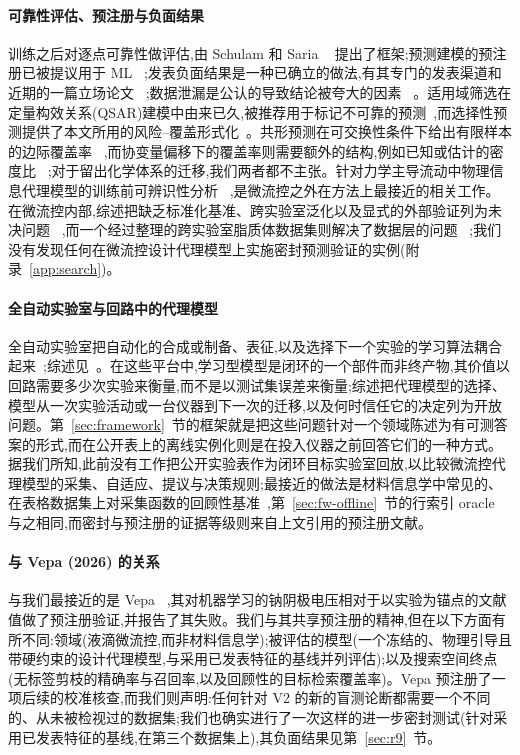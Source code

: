 \documentclass[11pt,a4paper]{ctexart}
\begin{document}
\paragraph{可靠性评估、预注册与负面结果} 训练之后对逐点可靠性做评估,由 Schulam 和 Saria ~\cite{schulam2019} 提出了框架;预测建模的预注册已被提议用于 ML ~\cite{hofman2023};发表负面结果是一种已确立的做法,有其专门的发表渠道和近期的一篇立场论文 ~\cite{karl2024};数据泄漏是公认的导致结论被夸大的因素 ~\cite{kapoor2023}。适用域筛选在定量构效关系(QSAR)建模中由来已久,被推荐用于标记不可靠的预测~\cite{tropsha2003,netzeva2005,sahigara2012},而选择性预测提供了本文所用的风险–覆盖形式化~\cite{elyaniv2010}。共形预测在可交换性条件下给出有限样本的边际覆盖率 ~\cite{vovk2005,romano2019},而协变量偏移下的覆盖率则需要额外的结构,例如已知或估计的密度比 ~\cite{tibshirani2019,barber2023};对于留出化学体系的迁移,我们两者都不主张。针对力学主导流动中物理信息代理模型的训练前可辨识性分析 ~\cite{cieslak2026},是微流控之外在方法上最接近的相关工作。在微流控内部,综述把缺乏标准化基准、跨实验室泛化以及显式的外部验证列为未决问题 ~\cite{labchip2025review,das2025,delgiudice2026},而一个经过整理的跨实验室脂质体数据集则解决了数据层的问题 ~\cite{smartmicrofluidics2026};我们没有发现任何在微流控设计代理模型上实施密封预测验证的实例(附录~\ref{app:search})。

\paragraph{全自动实验室与回路中的代理模型} 全自动实验室把自动化的合成或制备、表征,以及选择下一个实验的学习算法耦合起来~\cite{macleod2020};综述见~\cite{abolhasani2023,tom2024sdl}。在这些平台中,学习型模型是闭环的一个部件而非终产物,其价值以回路需要多少次实验来衡量,而不是以测试集误差来衡量;综述把代理模型的选择、模型从一次实验活动或一台仪器到下一次的迁移,以及何时信任它的决定列为开放问题。第~\ref{sec:framework}~节的框架就是把这些问题针对一个领域陈述为有可测答案的形式,而在公开表上的离线实例化则是在投入仪器之前回答它们的一种方式。据我们所知,此前没有工作把公开实验表作为闭环目标实验室回放,以比较微流控代理模型的采集、自适应、提议与决策规则;最接近的做法是材料信息学中常见的、在表格数据集上对采集函数的回顾性基准~\cite{liang2021bo},第~\ref{sec:fw-offline}~节的行索引 oracle 与之相同,而密封与预注册的证据等级则来自上文引用的预注册文献。

\paragraph{与 Vepa (2026) 的关系} 与我们最接近的是 Vepa ~\cite{vepa2026},其对机器学习的钠阴极电压相对于以实验为锚点的文献值做了预注册验证,并报告了其失败。我们与其共享预注册的精神,但在以下方面有所不同:领域(液滴微流控,而非材料信息学);被评估的模型(一个冻结的、物理引导且带硬约束的设计代理模型,与采用已发表特征的基线并列评估);以及搜索空间终点(无标签剪枝的精确率与召回率,以及回顾性的目标检索覆盖率)。Vepa 预注册了一项后续的校准核查,而我们则声明:任何针对 V2 的新的盲测论断都需要一个不同的、从未被检视过的数据集;我们也确实进行了一次这样的进一步密封测试(针对采用已发表特征的基线,在第三个数据集上),其负面结果见第~\ref{sec:r9}~节。
\end{document}

